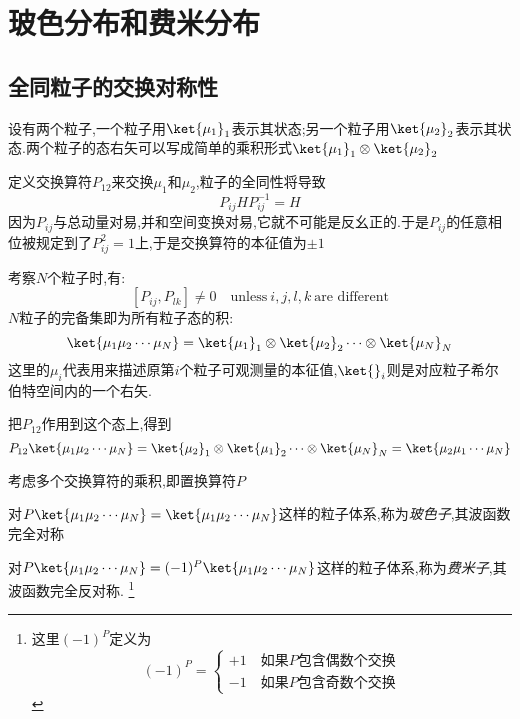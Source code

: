 \section{玻色分布和费米分布}

\subsection{全同粒子的交换对称性}
    设有两个粒子,一个粒子用$\ket{\mu_1}_1$表示其状态;另一个粒子用$\ket{\mu_2}_2$表示其状态.两个粒子的态右矢可以写成简单的乘积形式$\ket{\mu_1}_1 \otimes \ket{\mu_2}_2$

    定义交换算符$P_{12}$来交换$\mu_1$和$\mu_2$,粒子的全同性将导致
    \[P_{ij} H P_{ij}^{-1}=H\]
    因为$P_{ij}$与总动量对易,并和空间变换对易,它就不可能是反幺正的.于是$P_{ij}$的任意相位被规定到了$P_{ij}^{2}=1$上,于是交换算符的本征值为$\pm 1$

    考察$N$个粒子时,有:
    \[[P_{ij},P_{lk}]\neq 0 \quad \text{unless} ~i,j,l,k ~\text{are different}\]
    $N$粒子的完备集即为所有粒子态的积:
    \begin{equation}
      \ket{\mu_{1}\mu_2\cdots\mu_N}=\ket{\mu_1}_1 \otimes \ket{\mu_2}_2 \cdots \otimes \ket{\mu_N}_N
    \end{equation}
    这里的$\mu_i$代表用来描述原第$i$个粒子可观测量的本征值,$\ket{ }_i$则是对应粒子希尔伯特空间内的一个右矢.

    把$P_{12}$作用到这个态上,得到
    \begin{equation}
      P_{12}\ket{\mu_1\mu_2\cdots\mu_N}=\ket{\mu_2}_1 \otimes \ket{\mu_1}_2 \cdots\otimes \ket{\mu_N}_N=\ket{\mu_2 \mu_1 \cdots \mu_N}
    \end{equation}
    
    \vspace*{0.5cm
    }
    考虑多个交换算符的乘积,即置换算符$P$

    对$P\ket{\mu_1 \mu_2 \cdots \mu_N}=\ket{\mu_1 \mu_2 \cdots \mu_N}$这样的粒子体系,称为\emph{玻色子},其波函数完全对称

    对$P\ket{\mu_1 \mu_2 \cdots \mu_N}=(-1)^{P} \ket{\mu_1 \mu_2 \cdots \mu_N}$这样的粒子体系,称为\emph{费米子},其波函数完全反对称.
    \footnote{这里$(-1)^{P}$定义为
    \begin{equation}
      (-1)^{P}=\left\{ 
        \begin{aligned}
         +1\quad\text{如果$P$包含偶数个交换}\\
         -1\quad\text{如果$P$包含奇数个交换} 
        \end{aligned}
      \right.
    \end{equation}
    }
    
